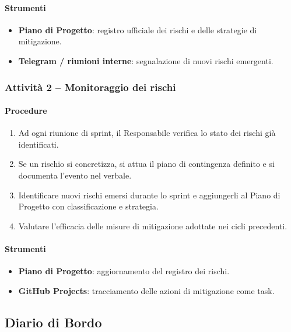 \documentclass[a4paper, 11pt, oneside]{scrartcl}
\begin{document}
\paragraph{Strumenti}
\begin{itemize}
    \item \textbf{Piano di Progetto}: registro ufficiale dei rischi e delle strategie di mitigazione.
    \item \textbf{Telegram / riunioni interne}: segnalazione di nuovi rischi emergenti.
\end{itemize}

\subsubsection{Attività 2 – Monitoraggio dei rischi}

\paragraph{Procedure}
\begin{enumerate}
    \item Ad ogni riunione di sprint, il Responsabile verifica lo stato dei rischi già identificati.
    \item Se un rischio si concretizza, si attua il piano di contingenza definito e si documenta l'evento nel verbale.
    \item Identificare nuovi rischi emersi durante lo sprint e aggiungerli al Piano di Progetto con classificazione e strategia.
    \item Valutare l'efficacia delle misure di mitigazione adottate nei cicli precedenti.
\end{enumerate}

\paragraph{Strumenti}
\begin{itemize}
    \item \textbf{Piano di Progetto}: aggiornamento del registro dei rischi.
    \item \textbf{GitHub Projects}: tracciamento delle azioni di mitigazione come task.
\end{itemize}

\subsection{Diario di Bordo}
\end{document}
